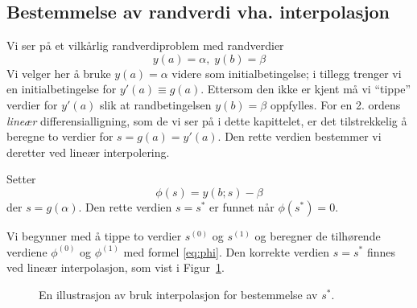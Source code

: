 \subsection{Bestemmelse av randverdi vha. interpolasjon} %
\label{sub:bestemme_}
Vi ser på et vilkårlig randverdiproblem med randverdier
\begin{equation}
  y(a) = \alpha, \; y(b) = \beta
\end{equation}
Vi velger her å bruke $y(a)=\alpha$ videre som initialbetingelse; i tillegg trenger vi en initialbetingelse for $y'(a)\equiv g(a)$. Ettersom den ikke er kjent må vi ``tippe'' verdier for $y'(a)$ slik at randbetingelsen $y(b)=\beta$ oppfylles. For en 2. ordens \emph{lineær} differensialligning, som de vi ser på i dette kapittelet, er det tilstrekkelig å beregne to verdier for $s=g(a)=y'(a)$. Den rette verdien bestemmer vi deretter ved lineær interpolering.

Setter
\begin{equation}
  \phi(s) = y(b;s) - \beta \label{eq:phi}
\end{equation}
der $s=g(\alpha)$. Den rette verdien $s=s^*$ er funnet når $\phi(s^*)=0$.

Vi begynner med å tippe to verdier $s^{(0)}$ og $s^{(1)}$ og beregner de tilhørende verdiene $\phi^{(0)}$ og $\phi^{(1)}$ med formel \eqref{eq:phi}. Den korrekte verdien $s=s^*$ finnes ved lineær interpolasjon, som vist i Figur~\ref{fig:interpolasjon}.

\begin{figure}[htbp]
\centering
{}
\caption{En illustrasjon av bruk interpolasjon for bestemmelse av $s^*$.}
\label{fig:interpolasjon}
\end{figure}

